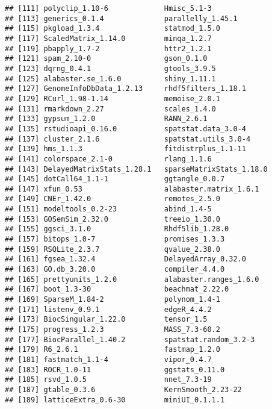 \documentclass[
  11pt,
  a4paper,
]{article}
\begin{document}
\begin{verbatim}
## [111] polyclip_1.10-6             Hmisc_5.1-3                
## [113] generics_0.1.4              parallelly_1.45.1          
## [115] pkgload_1.3.4               statmod_1.5.0              
## [117] ScaledMatrix_1.14.0         minqa_1.2.7                
## [119] pbapply_1.7-2               httr2_1.2.1                
## [121] spam_2.10-0                 gson_0.1.0                 
## [123] dqrng_0.4.1                 gtools_3.9.5               
## [125] alabaster.se_1.6.0          shiny_1.11.1               
## [127] GenomeInfoDbData_1.2.13     rhdf5filters_1.18.1        
## [129] RCurl_1.98-1.14             memoise_2.0.1              
## [131] rmarkdown_2.27              scales_1.4.0               
## [133] gypsum_1.2.0                RANN_2.6.1                 
## [135] rstudioapi_0.16.0           spatstat.data_3.0-4        
## [137] cluster_2.1.6               spatstat.utils_3.0-4       
## [139] hms_1.1.3                   fitdistrplus_1.1-11        
## [141] colorspace_2.1-0            rlang_1.1.6                
## [143] DelayedMatrixStats_1.28.1   sparseMatrixStats_1.18.0   
## [145] dotCall64_1.1-1             ggtangle_0.0.7             
## [147] xfun_0.53                   alabaster.matrix_1.6.1     
## [149] CNEr_1.42.0                 remotes_2.5.0              
## [151] modeltools_0.2-23           abind_1.4-5                
## [153] GOSemSim_2.32.0             treeio_1.30.0              
## [155] ggsci_3.1.0                 Rhdf5lib_1.28.0            
## [157] bitops_1.0-7                promises_1.3.3             
## [159] RSQLite_2.3.7               qvalue_2.38.0              
## [161] fgsea_1.32.4                DelayedArray_0.32.0        
## [163] GO.db_3.20.0                compiler_4.4.0             
## [165] prettyunits_1.2.0           alabaster.ranges_1.6.0     
## [167] boot_1.3-30                 beachmat_2.22.0            
## [169] SparseM_1.84-2              polynom_1.4-1              
## [171] listenv_0.9.1               edgeR_4.4.2                
## [173] BiocSingular_1.22.0         tensor_1.5                 
## [175] progress_1.2.3              MASS_7.3-60.2              
## [177] BiocParallel_1.40.2         spatstat.random_3.2-3      
## [179] R6_2.6.1                    fastmap_1.2.0              
## [181] fastmatch_1.1-4             vipor_0.4.7                
## [183] ROCR_1.0-11                 ggstats_0.11.0             
## [185] rsvd_1.0.5                  nnet_7.3-19                
## [187] gtable_0.3.6                KernSmooth_2.23-22         
## [189] latticeExtra_0.6-30         miniUI_0.1.1.1             

\end{verbatim}
\end{document}
